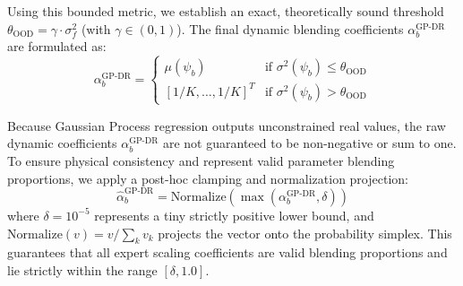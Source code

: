 Using this bounded metric, we establish an exact, theoretically sound threshold $\theta_{\text{OOD}} = \gamma \cdot \sigma_f^2$ (with $\gamma \in (0, 1)$). The final dynamic blending coefficients $\alpha^{\text{GP-DR}}_b$ are formulated as:
\begin{equation}
\alpha^{\text{GP-DR}}_b = \begin{cases} \mu(\psi_b) & \text{if } \sigma^2(\psi_b) \le \theta_{\text{OOD}} \\ [1/K, \dots, 1/K]^T & \text{if } \sigma^2(\psi_b) > \theta_{\text{OOD}} \end{cases}
\end{equation}

Because Gaussian Process regression outputs unconstrained real values, the raw dynamic coefficients $\alpha^{\text{GP-DR}}_b$ are not guaranteed to be non-negative or sum to one. To ensure physical consistency and represent valid parameter blending proportions, we apply a post-hoc clamping and normalization projection:
\begin{equation}
\hat{\alpha}^{\text{GP-DR}}_b = \text{Normalize}\left(\max\left(\alpha^{\text{GP-DR}}_b, \delta\right)\right)
\end{equation}
where $\delta = 10^{-5}$ represents a tiny strictly positive lower bound, and $\text{Normalize}(v) = v / \sum_k v_k$ projects the vector onto the probability simplex. This guarantees that all expert scaling coefficients are valid blending proportions and lie strictly within the range $[\delta, 1.0]$. 

